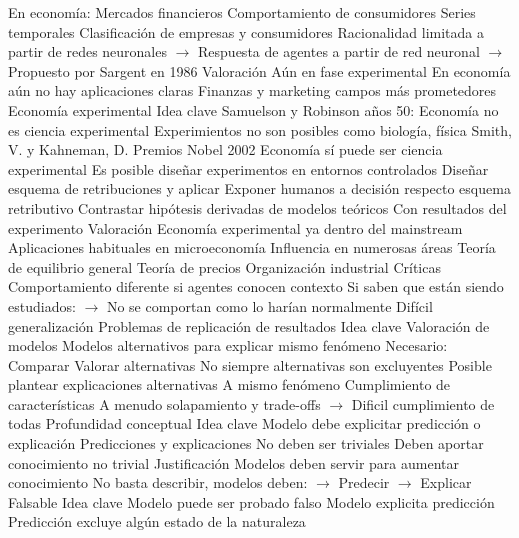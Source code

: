 \documentclass{nuevotema}
\begin{document}
\begin{esquemal}
				\4 En economía:
				\4[] Mercados financieros
				\4[] Comportamiento de consumidores
				\4[] Series temporales
				\4[] Clasificación de empresas y consumidores
				\4[] Racionalidad limitada a partir de redes neuronales
				\4[] $\to$ Respuesta de agentes a partir de red neuronal
				\4[] $\to$ Propuesto por Sargent en 1986
			\3 Valoración
				\4 Aún en fase experimental
				\4[] En economía aún no hay aplicaciones claras
				\4 Finanzas y marketing campos más prometedores
		\2 Economía experimental
			\3 Idea clave
				\4 Samuelson y Robinson años 50:
				\4[] Economía no es ciencia experimental
				\4[] Experimientos no son posibles como biología, física
				\4 Smith, V. y Kahneman, D. Premios Nobel 2002
				\4[] Economía sí puede ser ciencia experimental
				\4[] Es posible diseñar experimentos en entornos controlados
				\4[1] Diseñar esquema de retribuciones y aplicar
				\4[] Exponer humanos a decisión respecto esquema retributivo
				\4[2] Contrastar hipótesis derivadas de modelos teóricos
				\4[] Con resultados del experimento
			\3 Valoración
				\4 Economía experimental ya dentro del mainstream
				\4 Aplicaciones habituales en microeconomía
				\4 Influencia en numerosas áreas
				\4[] Teoría de equilibrio general
				\4[] Teoría de precios
				\4[] Organización industrial
				\4 Críticas
				\4[] Comportamiento diferente si agentes conocen contexto
				\4[] Si saben que están siendo estudiados:
				\4[] $\to$ No se comportan como lo harían normalmente
				\4[] Difícil generalización
				\4[] Problemas de replicación de resultados
	\1 
		\2 Idea clave
			\3 Valoración de modelos
				\4 Modelos alternativos para explicar mismo fenómeno
				\4 Necesario:
				\4[] Comparar
				\4[] Valorar alternativas
				\4 No siempre alternativas son excluyentes
				\4[] Posible plantear explicaciones alternativas
				\4[] A mismo fenómeno
			\3 Cumplimiento de características
				\4 A menudo solapamiento y trade-offs
				\4[] $\to$ Dificil cumplimiento de todas
		\2 Profundidad conceptual
			\3 Idea clave
				\4 Modelo debe explicitar predicción o explicación
				\4 Predicciones y explicaciones
				\4[] No deben ser triviales
				\4[$\then$] Deben aportar conocimiento no trivial
			\3 Justificación
				\4 Modelos deben servir para aumentar conocimiento
				\4 No basta describir, modelos deben:
				\4[] $\to$ Predecir
				\4[] $\to$ Explicar
		\2 Falsable
			\3 Idea clave
				\4 Modelo puede ser probado falso
				\4 Modelo explicita predicción
				\4[] Predicción excluye algún estado de la naturaleza

\end{esquemal}
\end{document}
